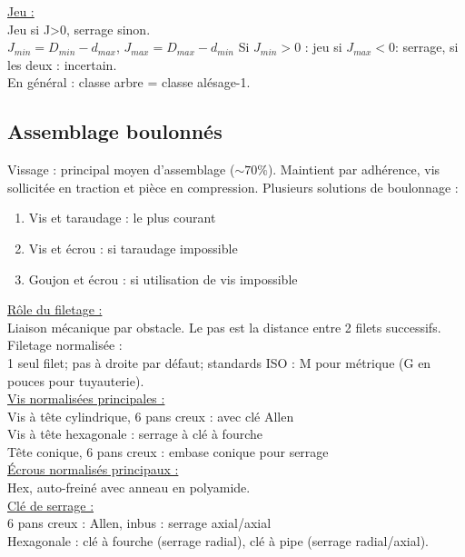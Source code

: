 \documentclass[../main.tex]{subfiles}
\begin{document}
\quad \underline{Jeu :}\\
Jeu si J>0, serrage sinon.\\
$J_{min} = D_{min} - d_{max}$, $J_{max} = D_{max}-d_{min}$
Si $J_{min} > 0$ : jeu si $J_{max} < 0$: serrage, si les deux : incertain.\\
En général : classe arbre = classe alésage-1.\\

\subsection{Assemblage boulonnés}
Vissage : principal moyen d'assemblage ($\sim 70\%$). Maintient par adhérence, vis sollicitée en traction et pièce en compression. Plusieurs solutions de boulonnage :\\
\begin{enumerate}
    \item Vis et taraudage : le plus courant\\
    \item Vis et écrou : si taraudage impossible\\
    \item Goujon et écrou : si utilisation de vis impossible\\
\end{enumerate}


\quad \underline{Rôle du filetage :}\\
Liaison mécanique par obstacle. Le pas est la distance entre 2 filets successifs. Filetage normalisée :\\
1 seul filet; pas à droite par défaut; standards ISO : M pour métrique (G en pouces pour tuyauterie).\\

\quad \underline{Vis normalisées principales :}\\
Vis à tête cylindrique, 6 pans creux : avec clé Allen\\
Vis à tête hexagonale : serrage à clé à fourche\\
Tête conique, 6 pans creux : embase conique pour serrage\\

\quad \underline{Écrous normalisés principaux :}\\
Hex, auto-freiné avec anneau en polyamide. \\

\quad \underline{Clé de serrage :}\\
6 pans creux : Allen, inbus : serrage axial/axial\\
Hexagonale : clé à fourche (serrage radial), clé à pipe (serrage radial/axial).\\
\end{document}

